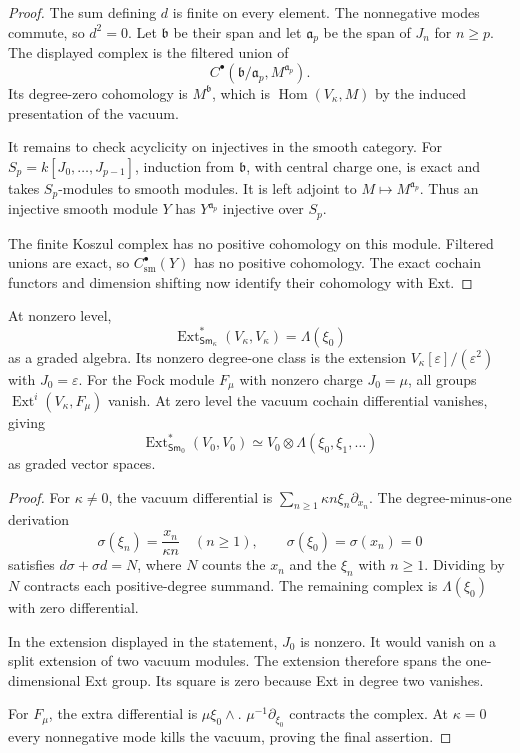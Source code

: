 \begin{proof}
The sum defining $d$ is finite on every element. The nonnegative
modes commute, so $d^2=0$. Let $\mathfrak b$ be their span and let
$\mathfrak a_p$ be the span of $J_n$ for $n\geq p$. The displayed
complex is the filtered union of
\[
 C^\bullet(\mathfrak b/\mathfrak a_p,M^{\mathfrak a_p}).
\]
Its degree-zero cohomology is $M^{\mathfrak b}$, which is
$\operatorname{Hom}(V_\kappa,M)$ by the induced presentation
of the vacuum.

It remains to check acyclicity on injectives in the smooth category.
For $S_p=k[J_0,\ldots,J_{p-1}]$, induction from $\mathfrak b$,
with central charge one, is exact and takes $S_p$-modules
to smooth modules. It is left adjoint to
$M\mapsto M^{\mathfrak a_p}$. Thus an injective smooth module
$Y$ has $Y^{\mathfrak a_p}$ injective over $S_p$.

The finite Koszul complex has no positive cohomology on this module.
Filtered unions are exact, so $C^\bullet_{\mathrm{sm}}(Y)$
has no positive cohomology. The exact cochain functors and
dimension shifting now identify their cohomology with Ext.
\end{proof}

\begin{theorem}
\label{v4-arith:centers:thm:charge-extensions}
At nonzero level,
\[
 \operatorname{Ext}^*_{\mathsf{Sm}_\kappa}(V_\kappa,V_\kappa)
 =\Lambda(\xi_0)
\]
as a graded algebra. Its nonzero degree-one class is the extension
$V_\kappa[\varepsilon]/(\varepsilon^2)$ with $J_0=\varepsilon$.
For the Fock module $F_\mu$ with nonzero charge $J_0=\mu$,
all groups $\operatorname{Ext}^i(V_\kappa,F_\mu)$ vanish.
At zero level the vacuum cochain differential vanishes, giving
\[
 \operatorname{Ext}^*_{\mathsf{Sm}_0}(V_0,V_0)
 \simeq V_0\otimes\Lambda(\xi_0,\xi_1,\ldots)
\]
as graded vector spaces.
\end{theorem}

\begin{proof}
For $\kappa\ne0$, the vacuum differential is
$\sum_{n\geq1}\kappa n\xi_n\partial_{x_n}$.
The degree-minus-one derivation
\[
 \sigma(\xi_n)=\frac{x_n}{\kappa n}\quad(n\geq1),
 \qquad \sigma(\xi_0)=\sigma(x_n)=0
\]
satisfies $d\sigma+\sigma d=N$, where $N$ counts the $x_n$
and the $\xi_n$ with $n\geq1$. Dividing by $N$ contracts
each positive-degree summand. The remaining complex is
$\Lambda(\xi_0)$ with zero differential.

In the extension displayed in the statement, $J_0$ is nonzero.
It would vanish on a split extension of two vacuum modules.
The extension therefore spans the one-dimensional Ext group.
Its square is zero because Ext in degree two vanishes.

For $F_\mu$, the extra differential is $\mu\xi_0\wedge$.
$\mu^{-1}\partial_{\xi_0}$ contracts the complex.
At $\kappa=0$ every nonnegative mode kills the vacuum, proving
the final assertion.
\end{proof}

